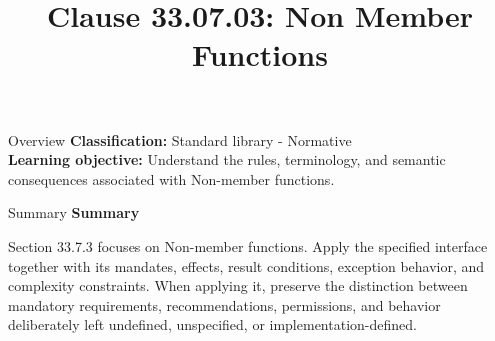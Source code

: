 \documentclass[10pt,letterpaper]{article}
\title{Clause 33.07.03: Non Member Functions}
\author{}
\date{}
\begin{document}
\maketitle
\begin{CornellOverviewBox}{Overview}
\textbf{Classification:} Standard library - Normative\\[2pt]
\textbf{Learning objective:} Understand the rules, terminology, and semantic consequences associated with Non-member functions.
\end{CornellOverviewBox}\begin{CornellSummaryBox}{Summary}
{\sffamily\bfseries\color{Accent} Summary}\par\vspace{3pt}Section 33.7.3 focuses on Non-member functions. Apply the specified interface together with its mandates, effects, result conditions, exception behavior, and complexity constraints. When applying it, preserve the distinction between mandatory requirements, recommendations, permissions, and behavior deliberately left undefined, unspecified, or implementation-defined.
\end{CornellSummaryBox}
\end{document}

